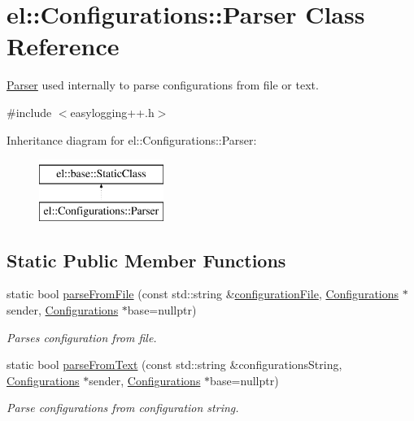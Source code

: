 \hypertarget{classel_1_1Configurations_1_1Parser}{\section{el\-:\-:Configurations\-:\-:Parser Class Reference}
\label{classel_1_1Configurations_1_1Parser}
}


\hyperlink{classel_1_1Configurations_1_1Parser}{Parser} used internally to parse configurations from file or text.  




{\ttfamily \#include $<$easylogging++.\-h$>$}

Inheritance diagram for el\-:\-:Configurations\-:\-:Parser\-:\begin{figure}[H]
\begin{center}
\leavevmode
\includegraphics[height=2.000000cm]{classel_1_1Configurations_1_1Parser}
\end{center}
\end{figure}
\subsection*{Static Public Member Functions}
\begin{DoxyCompactItemize}
\item 
static bool \hyperlink{classel_1_1Configurations_1_1Parser_a45def5007bf368c4d2a505af58cd94c2}{parse\-From\-File} (const std\-::string \&\hyperlink{classel_1_1Configurations_a18df64bb5cd97bee672160290133141c}{configuration\-File}, \hyperlink{classel_1_1Configurations}{Configurations} $\ast$sender, \hyperlink{classel_1_1Configurations}{Configurations} $\ast$base=nullptr)
\begin{DoxyCompactList}\small\item\em Parses configuration from file. \end{DoxyCompactList}\item 
static bool \hyperlink{classel_1_1Configurations_1_1Parser_a39ec1b06f673e8155a83d66e08229129}{parse\-From\-Text} (const std\-::string \&configurations\-String, \hyperlink{classel_1_1Configurations}{Configurations} $\ast$sender, \hyperlink{classel_1_1Configurations}{Configurations} $\ast$base=nullptr)
\begin{DoxyCompactList}\small\item\em Parse configurations from configuration string. \end{DoxyCompactList}\end{DoxyCompactItemize}
